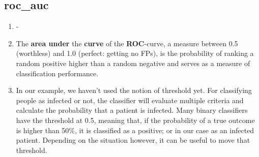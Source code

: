 \documentclass[12pt,a4paper]{article}
\begin{document}
\subsection{roc\_auc}
\begin{enumerate}
\item -
\item The \textbf{area under} the \textbf{curve} of the \textbf{ROC}-curve, a measure between 0.5 (worthless) and 1.0 (perfect: getting no FPs), is the probability of ranking a random positive higher than a random negative and serves as a measure of classification performance.
\item In our example, we haven't used the notion of threshold yet. For classifying people as infected or not, the classifier will evaluate multiple criteria and calculate the probability that a patient is infected. Many binary classifiers have the threshold at 0.5, meaning that, if the probability of a true outcome is higher than 50\%, it is classified as a positive; or in our case as an infected patient. Depending on the situation however, it can be useful to move that threshold.
\end{enumerate}
\end{document}

